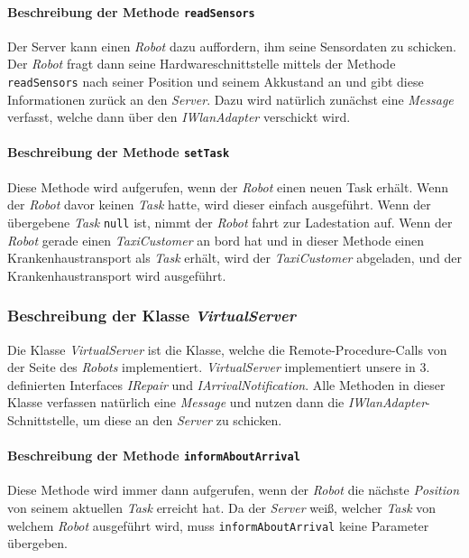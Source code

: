 			\paragraph{Beschreibung der Methode \texttt{readSensors}}
			Der Server kann einen \textit{Robot} dazu auffordern, ihm seine Sensordaten zu schicken. 
			Der \textit{Robot} fragt dann seine Hardwareschnittstelle mittels der Methode \texttt{readSensors} 
			nach seiner Position und seinem Akkustand an und gibt diese Informationen zurück an den \textit{Server}. 
			Dazu wird natürlich zunächst eine \textit{Message} verfasst, welche dann über den \textit{IWlanAdapter} verschickt wird.
			
			\paragraph{Beschreibung der Methode \texttt{setTask}}
			Diese Methode wird aufgerufen, wenn der \textit{Robot} einen neuen Task erhält. Wenn der \textit{Robot} davor keinen \textit{Task} hatte, wird dieser einfach ausgeführt. Wenn der übergebene \textit{Task} \texttt{null} ist, nimmt der \textit{Robot} fahrt zur Ladestation auf. Wenn der \textit{Robot} gerade einen \textit{TaxiCustomer} an bord hat und in dieser Methode einen Krankenhaustransport als \textit{Task} erhält, wird der \textit{TaxiCustomer} abgeladen, und der Krankenhaustransport wird ausgeführt.
			
	\subsubsection{Beschreibung der Klasse \textit{VirtualServer}}
	Die Klasse \textit{VirtualServer} ist die Klasse, welche die Remote-Procedure-Calls von der Seite des \textit{Robots} implementiert. \textit{VirtualServer} implementiert unsere in 3. definierten Interfaces \textit{IRepair} und \textit{IArrivalNotification}. Alle Methoden in dieser Klasse verfassen natürlich eine \textit{Message} und nutzen dann die \textit{IWlanAdapter}-Schnittstelle, um diese an den \textit{Server} zu schicken.
	
			\paragraph{Beschreibung der Methode \texttt{informAboutArrival}}
			Diese Methode wird immer dann aufgerufen, wenn der \textit{Robot} die nächste \textit{Position} von seinem aktuellen \textit{Task} erreicht hat.  Da der \textit{Server} weiß, welcher \textit{Task} von welchem \textit{Robot} ausgeführt wird, muss \texttt{informAboutArrival} keine Parameter übergeben.
	

